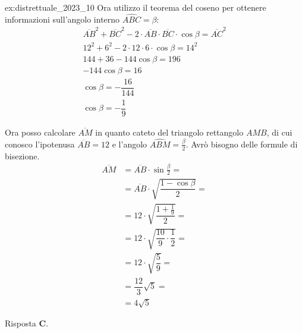 \begin{soluzione}{ex:distrettuale_2023_10}
    Ora utilizzo il teorema del coseno per ottenere informazioni sull'angolo interno $\hat{ABC} = \beta$:
    \begin{gather*}
        \overline{AB}^2 + \overline{BC}^2 - 2 \cdot \overline{AB} \cdot \overline{BC} \cdot \cos \beta = \overline{AC}^2 \\
        12^2 + 6^2 - 2 \cdot 12 \cdot 6 \cdot \cos \beta = 14^2 \\
        144 + 36 - 144 \cos \beta = 196 \\
        -144 \cos \beta = 16 \\
        \cos \beta = -\dfrac{16}{144} \\
        \cos \beta = -\dfrac{1}{9}
    \end{gather*}

    Ora posso calcolare $\overline{AM}$ in quanto cateto del triangolo rettangolo $AMB$, di cui conosco l'ipotenusa
    $\overline{AB} = 12$ e l'angolo $\hat{ABM} = \frac{\beta}{2}$.
    Avrò bisogno delle formule di bisezione.
    \begin{align*}
        \overline{AM} &= \overline{AB} \cdot \sin \frac{\beta}{2} = \\
        &= \overline{AB} \cdot \sqrt {\dfrac{1 - \cos \beta}{2}} = \\
        &= 12 \cdot \sqrt {\dfrac{1 + \frac{1}{9}}{2}} = \\
        &= 12 \cdot \sqrt {\dfrac{10}{9} \cdot \dfrac{1}{2}} = \\
        &= 12 \cdot \sqrt {\dfrac{5}{9}} = \\
        &= \dfrac{12}{3} \sqrt {5} = \\
        &= 4 \sqrt {5}
    \end{align*}

    Risposta \textbf{C}.
\end{soluzione}